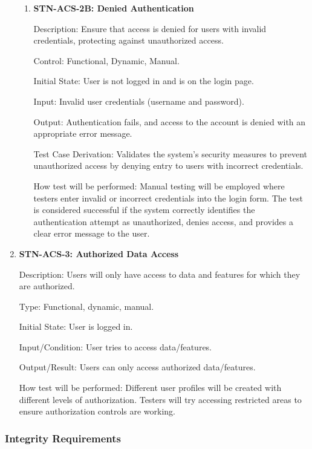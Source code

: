 \documentclass[12pt, titlepage]{article}
\begin{document}
\begin{enumerate}
\begin{enumerate}
                \item{\textbf{STN-ACS-2B: Denied Authentication}\\}
        
                Description: Ensure that access is denied for users with invalid credentials, protecting against unauthorized access.
        
                Control: Functional, Dynamic, Manual.
        
                Initial State: User is not logged in and is on the login page.
        
                Input: Invalid user credentials (username and password).
        
                Output: Authentication fails, and access to the account is denied with an appropriate error message.
        
                Test Case Derivation: Validates the system's security measures to prevent unauthorized access by denying entry to users with incorrect credentials.
        
                How test will be performed: Manual testing will be employed where testers enter invalid or incorrect credentials into the login form. The test is considered successful if the system correctly identifies the authentication attempt as unauthorized, denies access, and provides a clear error message to the user.
            \end{enumerate}


        \item{\textbf{STN-ACS-3: Authorized Data Access}}

        Description: Users will only have access to data and features for which they are authorized.

        Type: Functional, dynamic, manual.

        Initial State: User is logged in.

        Input/Condition: User tries to access data/features.

        Output/Result: Users can only access authorized data/features.

        How test will be performed: Different user profiles will be created with different levels of authorization. Testers will try accessing restricted areas to ensure authorization controls are working.

    \end{enumerate}


    \subsubsection{Integrity Requirements}
\end{document}
